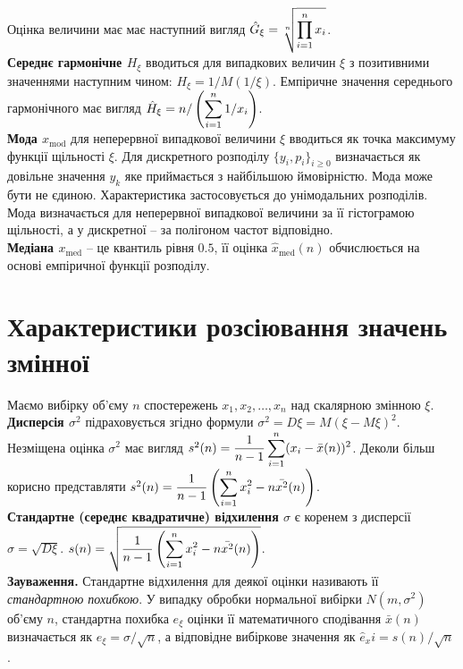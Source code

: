 Оцінка величини має має наступний вигляд $\hat{G}_\xi = \sqrt[n]{\displaystyle\prod\limits_{i=1}^n x_i}$. \\

\textbf{Середнє гармонічне $H_\xi$} вводиться для випадкових величин $\xi$ з позитивними значеннями наступним чином: $H_\xi = 1 / M(1 / \xi)$. Емпіричне значення середнього гармонічного має вигляд $\hat{H}_\xi = n / \left(\displaystyle\sum\limits_{i=1}^n 1/x_i \right)$. \\

\textbf{Мода $x_{\text{mod}}$} для неперервної випадкової величини $\xi$ вводиться як точка максимуму функції щільності $\xi$. Для дискретного розподілу $\{ y_i, p_i \}_{i \ge 0}$ визначається як довільне значення $y_k$ яке приймається з найбільшою ймовірністю. Мода може бути не єдиною. Характеристика застосовується до унімодальних розподілів. Мода визначається для неперервної випадкової величини за її гістограмою щільності, а у дискретної -- за полігоном частот відповідно.\\

\textbf{Медіана $x_{\text{med}}$} -- це квантиль рівня $0.5$, її оцінка $\hat{x}_{\text{med}}(n)$ обчислюється на основі емпіричної функції розподілу. 

\section{Характеристики розсіювання значень змінної}

Маємо вибірку об'єму $n$ спостережень $x_1, x_2, \ldots, x_n$ над скалярною змінною $\xi$. \\

\textbf{Дисперсія $\sigma^2$} підраховується згідно формули $\sigma^2 = D\xi = M(\xi - M \xi)^2$. Незміщена оцінка $\sigma^2$ має вигляд $s^2(n) = \dfrac{1}{n-1} \displaystyle\sum\limits_{i=1}^n (x_i - \bar{x}(n))^2$. Деколи більш корисно представляти $s^2(n) = \dfrac{1}{n-1} \left(\displaystyle\sum\limits_{i=1}^n x_i^2 - n \bar{x^2}(n)\right)$. \\

\textbf{Стандартне (середнє квадратичне) відхилення $\sigma$} є коренем з дисперсії $\sigma = \sqrt{D \xi}$. $s(n) = \sqrt{\dfrac{1}{n-1} \left(\displaystyle\sum\limits_{i=1}^n x_i^2 - n \bar{x^2}(n)\right)}$. \\

\textbf{Зауваження.} Стандартне відхилення для деякої оцінки називають її \textit{стандартною похибкою}. У випадку обробки нормальної вибірки $N(m, \sigma^2)$ об'єму $n$, стандартна похибка $e_\xi$ оцінки її математичного сподівання $\bar{x}(n)$ визначається як $e_\xi = \sigma / \sqrt{n}$, а відповідне вибіркове значення як $\hat{e}_xi = s(n) / \sqrt{n}$. \\

